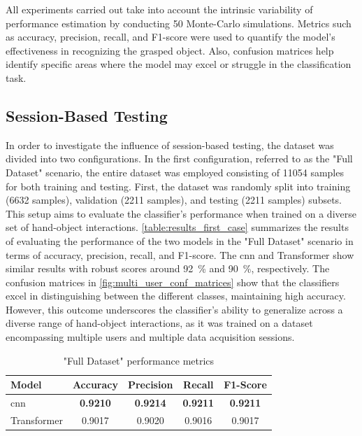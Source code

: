 All experiments carried out take into account the intrinsic variability of performance estimation by conducting 50 Monte-Carlo simulations. Metrics such as accuracy, precision, recall, and F1-score were used to quantify the model’s effectiveness in recognizing the grasped object. Also, confusion matrices help identify specific areas where the model may excel or struggle in the classification task.

\subsection{Session-Based Testing}
In order to investigate the influence of session-based testing, the dataset was divided into two configurations. In the first configuration, referred to as the "Full Dataset" scenario, the entire dataset was employed consisting of \num{11054} samples for both training and testing. First, the dataset was randomly split into training (\num{6632} samples), validation (\num{2211} samples), and testing (\num{2211} samples) subsets. This setup aims to evaluate the classifier's performance when trained on a diverse set of hand-object interactions. \autoref{table:results_first_case} summarizes the results of evaluating the performance of the two models in the "Full Dataset" scenario in terms of accuracy, precision, recall, and F1-score. The \acs{cnn} and Transformer show similar results with robust scores around \SI{92}{\percent} and \SI{90}{\percent}, respectively. The confusion matrices in \autoref{fig:multi_user_conf_matrices} show that the classifiers excel in distinguishing between the different classes, maintaining high accuracy. However, this outcome underscores the classifier's ability to generalize across a diverse range of hand-object interactions, as it was trained on a dataset encompassing multiple users and multiple data acquisition sessions.

\begin{table}[ht]
    \centering
    \caption{"Full Dataset" performance metrics}
    \label{table:results_first_case}
    \begin{tabular}{lcccc}
        \toprule
        Model & Accuracy & Precision & Recall & F1-Score \\
        \midrule
        \acs{cnn} & \textbf{0.9210} & \textbf{0.9214} & \textbf{0.9211} & \textbf{0.9211} \\
        Transformer & 0.9017 & 0.9020 & 0.9016 & 0.9017 \\
        \bottomrule
    \end{tabular}
\end{table}


